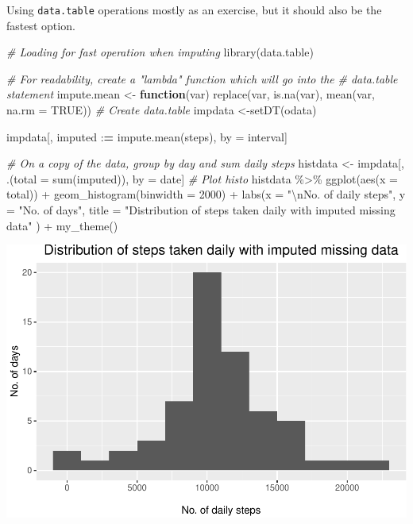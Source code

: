 \documentclass[
  paper=a4,
  ,captions=tableheading
]{scrartcl}
\newenvironment{Shaded}{\begin{snugshade}}{\end{snugshade}}
\newcommand{\AttributeTok}[1]{\textcolor[rgb]{0.77,0.63,0.00}{#1}}
\newcommand{\CommentTok}[1]{\textcolor[rgb]{0.56,0.35,0.01}{\textit{#1}}}
\newcommand{\ConstantTok}[1]{\textcolor[rgb]{0.00,0.00,0.00}{#1}}
\newcommand{\ControlFlowTok}[1]{\textcolor[rgb]{0.13,0.29,0.53}{\textbf{#1}}}
\newcommand{\DecValTok}[1]{\textcolor[rgb]{0.00,0.00,0.81}{#1}}
\newcommand{\ErrorTok}[1]{\textcolor[rgb]{0.64,0.00,0.00}{\textbf{#1}}}
\newcommand{\FunctionTok}[1]{\textcolor[rgb]{0.00,0.00,0.00}{#1}}
\newcommand{\NormalTok}[1]{#1}
\newcommand{\OtherTok}[1]{\textcolor[rgb]{0.56,0.35,0.01}{#1}}
\newcommand{\SpecialCharTok}[1]{\textcolor[rgb]{0.00,0.00,0.00}{#1}}
\newcommand{\StringTok}[1]{\textcolor[rgb]{0.31,0.60,0.02}{#1}}
\begin{document}
Using \texttt{data.table} operations mostly as an exercise, but it
should also be the fastest option.

\begin{Shaded}
\begin{Highlighting}[]
\CommentTok{\# Loading for fast operation when imputing}
\FunctionTok{library}\NormalTok{(data.table)}

\CommentTok{\# For readability, create a "lambda" function which will go into the}
\CommentTok{\# data.table statement}
\NormalTok{impute.mean }\OtherTok{\textless{}{-}} \ControlFlowTok{function}\NormalTok{(var) }\FunctionTok{replace}\NormalTok{(var, }\FunctionTok{is.na}\NormalTok{(var), }\FunctionTok{mean}\NormalTok{(var, }\AttributeTok{na.rm =} \ConstantTok{TRUE}\NormalTok{))}
\CommentTok{\# Create data.table}
\NormalTok{impdata }\OtherTok{\textless{}{-}}\FunctionTok{setDT}\NormalTok{(odata)}

\NormalTok{impdata[,}
\NormalTok{        imputed }\SpecialCharTok{:}\ErrorTok{=} \FunctionTok{impute.mean}\NormalTok{(steps),}
\NormalTok{        by }\OtherTok{=}\NormalTok{ interval]}

\CommentTok{\# On a copy of the data, group by day and sum daily steps}
\NormalTok{histdata }\OtherTok{\textless{}{-}}\NormalTok{ impdata[,}
\NormalTok{                    .(}\AttributeTok{total =} \FunctionTok{sum}\NormalTok{(imputed)),}
\NormalTok{                    by }\OtherTok{=}\NormalTok{ date]}
\CommentTok{\# Plot histo}
\NormalTok{histdata }\SpecialCharTok{\%\textgreater{}\%}
  \FunctionTok{ggplot}\NormalTok{(}\FunctionTok{aes}\NormalTok{(}\AttributeTok{x =}\NormalTok{ total)) }\SpecialCharTok{+}
  \FunctionTok{geom\_histogram}\NormalTok{(}\AttributeTok{binwidth =} \DecValTok{2000}\NormalTok{) }\SpecialCharTok{+}
  \FunctionTok{labs}\NormalTok{(}\AttributeTok{x =} \StringTok{"}\SpecialCharTok{\textbackslash{}n}\StringTok{No. of daily steps"}\NormalTok{,}
       \AttributeTok{y =} \StringTok{"No. of days"}\NormalTok{,}
       \AttributeTok{title =} \StringTok{"Distribution of steps taken daily with imputed missing data"}
\NormalTok{       ) }\SpecialCharTok{+}
  \FunctionTok{my\_theme}\NormalTok{()}
\end{Highlighting}
\end{Shaded}

\begin{center}\includegraphics[width=0.6\linewidth]{PA1_template_files/figure-latex/week-analysis-1} \end{center}
\end{document}
